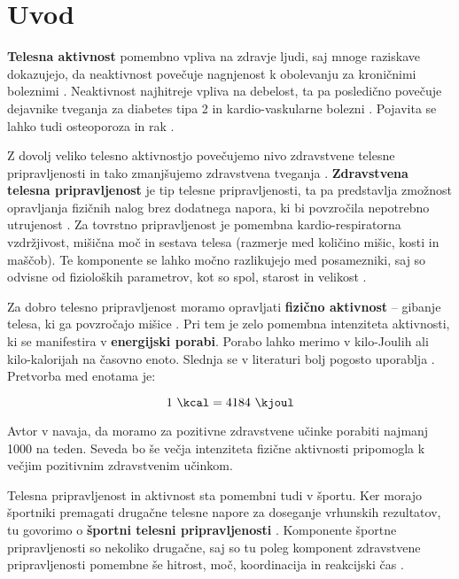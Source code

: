 \chapter{Uvod} \label{uvod}
\textbf{Telesna aktivnost} pomembno vpliva na zdravje ljudi, saj mnoge raziskave dokazujejo, da neaktivnost povečuje nagnjenost k obolevanju za kroničnimi boleznimi \cite{warburton2006health}. Neaktivnost najhitreje vpliva na debelost, ta pa posledično povečuje dejavnike tveganja za diabetes tipa 2 in kardio-vaskularne bolezni \cite{bassuk2005epidemiological}. Pojavita se lahko tudi osteoporoza in rak \cite{warburton2006health}. 

Z dovolj veliko telesno aktivnostjo povečujemo nivo zdravstvene telesne pripravljenosti in tako zmanjšujemo zdravstvena tveganja \cite{caspersen1985physical}. \textbf{Zdravstvena telesna pripravljenost} je tip telesne pripravljenosti, ta pa predstavlja zmožnost opravljanja fizičnih nalog brez dodatnega napora, ki bi povzročila nepotrebno utrujenost \cite{caspersen1985physical}. Za tovrstno pripravljenost je pomembna kardio-respiratorna vzdržjivost, mišična moč in sestava telesa (razmerje med količino mišic, kosti in maščob). Te komponente se lahko močno razlikujejo med posamezniki, saj so odvisne od fizioloških parametrov, kot so spol, starost in velikost \cite{caspersen1985physical}.

Za dobro telesno pripravljenost moramo opravljati \textbf{fizično aktivnost} -- gibanje telesa, ki ga povzročajo mišice \cite{caspersen1985physical}. Pri tem je zelo pomembna intenziteta aktivnosti, ki se manifestira v \textbf{energijski porabi}. Porabo lahko merimo v kilo-Joulih ali kilo-kalorijah na časovno enoto. Slednja se v literaturi bolj pogosto uporablja \cite{caspersen1985physical}. Pretvorba med enotama je: 

\begin{equation} \label{eq:pretvorba}
	1~\mathrm{\si{\kcal}} = 4184~\mathrm{\si{\kjoul}}
\end{equation}


Avtor v \cite{warburton2006health} navaja, da moramo za pozitivne zdravstvene učinke porabiti najmanj \SI{1000}{\kcal} na teden. Seveda bo še večja intenziteta fizične aktivnosti pripomogla k večjim pozitivnim zdravstvenim učinkom.

Telesna pripravljenost in aktivnost sta pomembni tudi v športu. Ker morajo športniki premagati drugačne telesne napore za doseganje vrhunskih rezultatov, tu govorimo o \textbf{športni telesni pripravljenosti} \cite{caspersen1985physical}. Komponente športne pripravljenosti so nekoliko drugačne, saj so tu poleg komponent zdravstvene pripravljenosti pomembne še hitrost, moč, koordinacija in reakcijski čas \cite{caspersen1985physical}.

